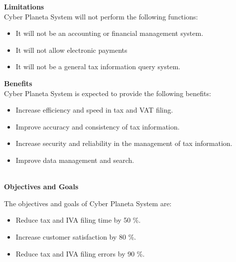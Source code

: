 \documentclass[12pt,a4paper, twosite]{article}
\begin{document}
\textbf{Limitations}
\\
Cyber Planeta System will not perform the following functions:
\begin{itemize}
    \item It will not be an accounting or financial management system.
     \item It will not allow electronic payments
     \item It will not be a general tax information query system.
\end{itemize}

\textbf{Benefits}
\\
Cyber Planeta System is expected to provide the following benefits:
\begin{itemize}
    \item Increase efficiency and speed in tax and VAT filing.
    \item Improve accuracy and consistency of tax information.
    \item Increase security and reliability in the management of tax information.
    \item Improve data management and search.    
\end{itemize}
\\

\textbf{Objectives and Goals}

The objectives and goals of Cyber Planeta System are:
\begin{itemize}
    \item Reduce tax and IVA filing time by 50 \%.
    \item Increase customer satisfaction by 80 \%.
    \item Reduce tax and IVA filing errors by 90 \%.    
\end{itemize}
\end{document}
